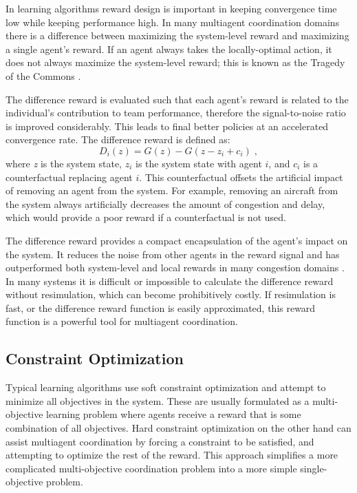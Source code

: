 \documentclass{aamas2014}
\begin{document}
In learning algorithms reward design is important in keeping convergence time low while keeping performance high. In many multiagent coordination domains there is a difference between maximizing the system-level reward and maximizing a single agent's reward. If an agent always takes the locally-optimal action, it does not always maximize the system-level reward; this is known as the Tragedy of the Commons \cite{Hardin}.

The difference reward \cite{tumer-wolpert_jair02} is evaluated such that each agent's reward is related to the individual's contribution to team performance, therefore the signal-to-noise ratio is improved considerably. This leads to final better policies at an accelerated convergence rate. The difference reward is defined as:
%
\begin{equation}
D_i(z) = G(z) - G(z - z_i + c_i)\;,
\end{equation}
%
where \textit{z} is the system state, $z_i$ is the system state with agent $i$, and $c_i$ is a counterfactual replacing agent $i$. This counterfactual offsets the artificial impact of removing an agent from the system. For example, removing an aircraft from the system always artificially decreases the amount of congestion and delay, which would provide a poor reward if a counterfactual is not used.

The difference reward provides a compact encapsulation of the agent's impact on the system. It reduces the noise from other agents in the reward signal and has outperformed both system-level and local rewards in many congestion domains \cite{AAMAS12-agmon, Agogino:2012:ELS:2330163.2330306, Colby:2012:SFF:2343576.2343637, tumer-wolpert_jair02}. In many systems it is difficult or impossible to calculate the difference reward without resimulation, which can become prohibitively costly. If resimulation is fast, or the difference reward function is easily approximated, this reward function is a powerful tool for multiagent coordination.

\subsection{Constraint Optimization}
Typical learning algorithms use soft constraint optimization and attempt to minimize all objectives in the system. These are usually formulated as a multi-objective learning problem where agents receive a reward that is some combination of all objectives. Hard constraint optimization on the other hand can assist multiagent coordination by forcing a constraint to be satisfied, and attempting to optimize the rest of the reward. This approach simplifies a more complicated multi-objective coordination problem into a more simple single-objective problem.
\end{document}
